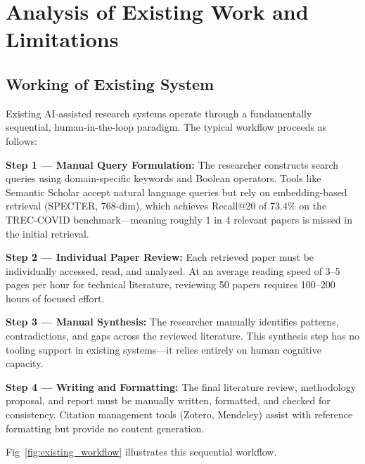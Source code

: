 \documentclass[a4paper,12pt,openany]{report}
\begin{document}

\chapter{Analysis of Existing Work and Limitations}

\section{Working of Existing System}

Existing AI-assisted research systems operate through a fundamentally sequential, human-in-the-loop paradigm. The typical workflow proceeds as follows:

\textbf{Step 1 --- Manual Query Formulation:} The researcher constructs search queries using domain-specific keywords and Boolean operators. Tools like Semantic Scholar accept natural language queries but rely on embedding-based retrieval (SPECTER, 768-dim), which achieves Recall@20 of 73.4\% on the TREC-COVID benchmark---meaning roughly 1 in 4 relevant papers is missed in the initial retrieval.

\textbf{Step 2 --- Individual Paper Review:} Each retrieved paper must be individually accessed, read, and analyzed. At an average reading speed of 3--5 pages per hour for technical literature, reviewing 50 papers requires 100--200 hours of focused effort.

\textbf{Step 3 --- Manual Synthesis:} The researcher manually identifies patterns, contradictions, and gaps across the reviewed literature. This synthesis step has no tooling support in existing systems---it relies entirely on human cognitive capacity.

\textbf{Step 4 --- Writing and Formatting:} The final literature review, methodology proposal, and report must be manually written, formatted, and checked for consistency. Citation management tools (Zotero, Mendeley) assist with reference formatting but provide no content generation.

Fig~\ref{fig:existing_workflow} illustrates this sequential workflow.
\end{document}
